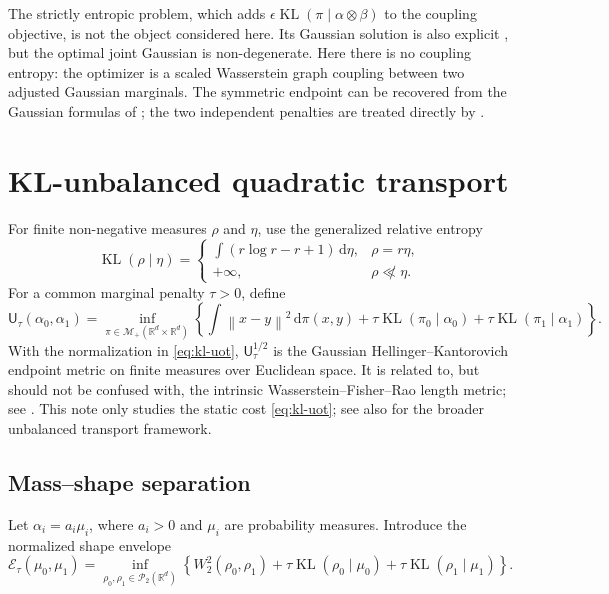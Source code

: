 \documentclass[11pt]{article}
\theoremstyle{definition}
\theoremstyle{remark}
\newcommand{\R}{\mathbb R}
\newcommand{\Mplus}{\mathcal M_+}
\newcommand{\Ptwo}{\mathcal P_2}
\newcommand{\KL}{\operatorname{KL}}
\newcommand{\UOT}{\mathsf U}
\newcommand{\dd}{\,\mathrm d}
\newcommand{\norm}[1]{\left\lVert #1\right\rVert}
\begin{document}
The strictly entropic problem, which adds
$\epsilon\KL(\pi\mid\alpha\otimes\beta)$ to the coupling objective, is not the
object considered here. Its Gaussian solution is also explicit
\citep{JanatiEtAl2020}, but the optimal joint Gaussian is non-degenerate. Here
there is no coupling entropy: the optimizer is a scaled Wasserstein graph
coupling between two adjusted Gaussian marginals. The symmetric endpoint can
be recovered from the Gaussian formulas of \citet{JanatiEtAl2020}; the two
independent penalties are treated directly by \citet{YangZhang2026}.

\section{KL-unbalanced quadratic transport}

For finite non-negative measures $\rho$ and $\eta$, use the generalized
relative entropy
\begin{equation}\label{eq:generalized-kl}
 \KL(\rho\mid\eta)
 =\begin{cases}
   \displaystyle\int(r\log r-r+1)\dd\eta,
      & \rho=r\eta,\\[1mm]
   +\infty,&\rho\not\ll\eta.
  \end{cases}
\end{equation}
For a common marginal penalty $\tau>0$, define
\begin{equation}\label{eq:kl-uot}
 \UOT_\tau(\alpha_0,\alpha_1)
 =\inf_{\pi\in\Mplus(\R^d\times\R^d)}
 \left\{
   \int\norm{x-y}^2\dd\pi(x,y)
   +\tau\KL(\pi_0\mid\alpha_0)
   +\tau\KL(\pi_1\mid\alpha_1)
 \right\}.
\end{equation}
With the normalization in \eqref{eq:kl-uot},
$\UOT_\tau^{1/2}$ is the Gaussian Hellinger--Kantorovich endpoint metric on
finite measures over Euclidean space. It is related to, but should not be
confused with, the intrinsic Wasserstein--Fisher--Rao length metric; see
\citet{LieroMielkeSavare2018}. This note only studies the static cost
\eqref{eq:kl-uot}; see also \citet{ChizatEtAl2018} for the broader unbalanced
transport framework.

\subsection{Mass--shape separation}

Let $\alpha_i=a_i\mu_i$, where $a_i>0$ and $\mu_i$ are probability measures.
Introduce the normalized shape envelope
\begin{equation}\label{eq:shape-envelope}
 \mathcal E_\tau(\mu_0,\mu_1)
 =\inf_{\rho_0,\rho_1\in\Ptwo(\R^d)}
 \left\{
   W_2^2(\rho_0,\rho_1)
   +\tau\KL(\rho_0\mid\mu_0)
   +\tau\KL(\rho_1\mid\mu_1)
 \right\}.
\end{equation}
\end{document}
